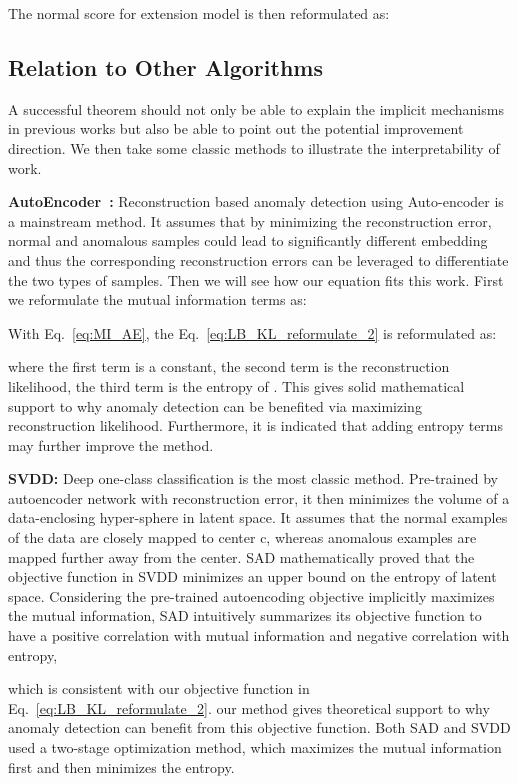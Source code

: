 \documentclass[journal]{IEEEtran}
\theoremstyle{remark}
\begin{document}
The normal score for extension model is then reformulated as:


\subsection{Relation to Other Algorithms}

A successful theorem should not only be able to explain the implicit mechanisms in previous works but also be able to point out the potential improvement direction. We then take some classic methods to illustrate the interpretability of work.

\textbf{AutoEncoder~\cite{vincent2008extracting}:} 
Reconstruction based anomaly detection using Auto-encoder is a mainstream method. It assumes that by minimizing the reconstruction error, normal and anomalous samples could lead to significantly different embedding and thus the corresponding reconstruction errors can be leveraged to differentiate the two types of samples. Then we will see how our equation fits this work.
First we reformulate the mutual information terms as:


With Eq.~\ref{eq:MI_AE}, the Eq.~\ref{eq:LB_KL_reformulate_2} is reformulated as:

where the first term is a constant, the second term is the reconstruction likelihood, the third term is the entropy of . This gives solid mathematical support to why anomaly detection can be benefited via maximizing reconstruction likelihood. Furthermore, it is indicated that adding entropy terms may further improve the method.


\textbf{SVDD\cite{SVDD}:} 
Deep one-class classification is the most classic method. Pre-trained by autoencoder network with reconstruction error, it then minimizes the volume of a data-enclosing hyper-sphere in latent space. It assumes that the normal examples of the data are closely mapped to center c, whereas anomalous examples are mapped further away from the center. SAD\cite{SAD} mathematically proved that the objective function in SVDD minimizes an upper bound on the entropy of latent space. Considering the pre-trained autoencoding objective implicitly maximizes the mutual information, SAD intuitively summarizes its objective function to have a positive correlation with mutual information and negative correlation with entropy, 

which is consistent with our objective function in Eq.~\ref{eq:LB_KL_reformulate_2}. our method gives theoretical support to why anomaly detection can benefit from this objective function. Both SAD and SVDD used a two-stage optimization method, which maximizes the mutual information first and then minimizes the entropy. 
\end{document}
